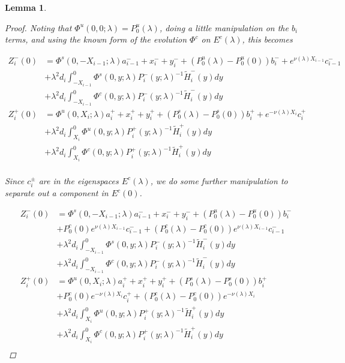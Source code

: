 \documentclass[12pt]{article}
\newtheorem{lemma}{Lemma}
\begin{document}
\begin{lemma}
\begin{proof}
Noting that $\Phi^u(0, 0; \lambda) = P_0^u(\lambda)$, doing a little manipulation on the $b_i$ terms, and using the known form of the evolution $\Phi^c$ on $E^c(\lambda)$, this becomes

\begin{align*}
Z_i^-(0) &= \Phi^s(0, -X_{i-1}; \lambda) a_{i-1}^- + x_i^- + y_i^- + (P_0^u(\lambda) - P_0^u(0))b_i^- + e^{\nu(\lambda) X_{i-1}} c_{i-1}^- \\
&+ \lambda^2 d_i \int_{-X_{i-1}}^0 \Phi^s(0, y; \lambda) P_i^-(y; \lambda)^{-1} \tilde{H}_i^-(y) dy \\
&+ \lambda^2 d_i \int_{-X_{i-1}}^0 \Phi^c(0, y; \lambda) P_i^-(y; \lambda)^{-1} \tilde{H}_i^-(y) dy  \\ 
Z_i^+(0) &= \Phi^u(0, X_i; \lambda) a_i^+ + x_i^+ + y_i^+ + (P_0^s(\lambda) - P_0^s(0)) b_i^+ + e^{-\nu(\lambda)X_i} c_i^+ \\
&+ \lambda^2 d_i \int_{X_i}^0 \Phi^u(0, y; \lambda) P_i^+(y; \lambda)^{-1} \tilde{H}_i^+(y) dy \\
&+ \lambda^2 d_i \int_{X_i}^0 \Phi^c(0, y; \lambda) P_i^+(y; \lambda)^{-1} \tilde{H}_i^+(y) dy \\
\end{align*}

Since $c_i^\pm$ are in the eigenspaces $E^c(\lambda)$, we do some further manipulation to separate out a component in $E^c(0)$.

\begin{align*}
Z_i^-(0) &= \Phi^s(0, -X_{i-1}; \lambda) a_{i-1}^- + x_i^- + y_i^- + (P_0^u(\lambda) - P_0^u(0))b_i^- \\
&+ P_0^c(0) e^{\nu(\lambda) X_{i-1}} c_{i-1}^- + (P_0^c(\lambda) - P_0^c(0)) e^{\nu(\lambda) X_{i-1}} c_{i-1}^- \\
&+ \lambda^2 d_i \int_{-X_{i-1}}^0 \Phi^s(0, y; \lambda) P_i^-(y; \lambda)^{-1} \tilde{H}_i^-(y) dy \\
&+ \lambda^2 d_i \int_{-X_{i-1}}^0 \Phi^c(0, y; \lambda) P_i^-(y; \lambda)^{-1} \tilde{H}_i^-(y) dy  \\ 
Z_i^+(0) &= \Phi^u(0, X_i; \lambda) a_i^+ + x_i^+ + y_i^+ + (P_0^s(\lambda) - P_0^s(0)) b_i^+ \\
&+ P_0^c(0) e^{-\nu(\lambda)X_i} c_i^+ + (P_0^c(\lambda) - P_0^c(0)) e^{-\nu(\lambda)X_i} \\
&+ \lambda^2 d_i \int_{X_i}^0 \Phi^u(0, y; \lambda) P_i^+(y; \lambda)^{-1} \tilde{H}_i^+(y) dy \\
&+ \lambda^2 d_i \int_{X_i}^0 \Phi^c(0, y; \lambda) P_i^+(y; \lambda)^{-1} \tilde{H}_i^+(y) dy \\
\end{align*}


\end{proof}
\end{lemma}
\end{document}
